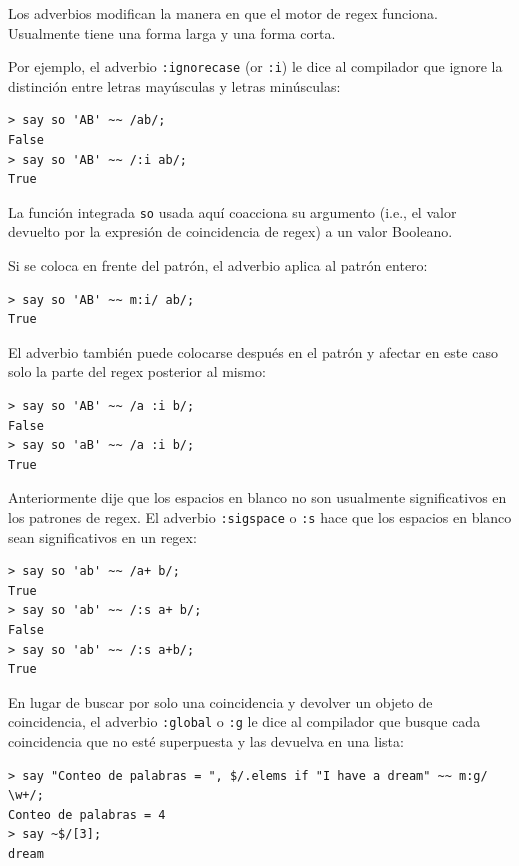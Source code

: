 Los adverbios modifican la manera en que el motor de regex funciona.
Usualmente tiene una forma larga y una forma corta.

Por ejemplo, el adverbio \verb|:ignorecase| (or \verb|:i|)
le dice al compilador que ignore la distinción entre letras
mayúsculas y letras minúsculas: 

\begin{verbatim}
> say so 'AB' ~~ /ab/;
False
> say so 'AB' ~~ /:i ab/;
True
\end{verbatim}
%

La función integrada \verb|so| usada aquí coacciona su argumento 
(i.e., el valor devuelto por la expresión de coincidencia de regex)
a un valor Booleano.

Si se coloca en frente del patrón, el adverbio aplica al patrón
entero:

\begin{verbatim}
> say so 'AB' ~~ m:i/ ab/;
True
\end{verbatim}
%

El adverbio también puede colocarse después en el patrón y afectar
en este caso solo la parte del regex posterior al mismo:

\begin{verbatim}
> say so 'AB' ~~ /a :i b/;
False
> say so 'aB' ~~ /a :i b/;
True
\end{verbatim}
%

Anteriormente dije que los espacios en blanco no son usualmente
significativos en los patrones de regex. El adverbio \verb|:sigspace|
o \verb|:s| hace que los espacios en blanco sean significativos en 
un regex:

\begin{verbatim}
> say so 'ab' ~~ /a+ b/;
True
> say so 'ab' ~~ /:s a+ b/;
False
> say so 'ab' ~~ /:s a+b/;
True
\end{verbatim}
%

En lugar de buscar por solo una coincidencia y devolver
un objeto de coincidencia, el adverbio \verb|:global| 
o \verb|:g| le dice al compilador que busque cada
coincidencia que no esté superpuesta y las devuelva
en una lista:

\begin{verbatim}
> say "Conteo de palabras = ", $/.elems if "I have a dream" ~~ m:g/ \w+/;
Conteo de palabras = 4
> say ~$/[3];
dream
\end{verbatim}
%

